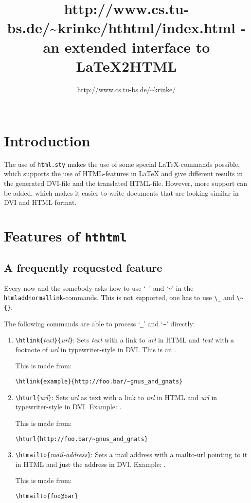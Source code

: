 \documentclass[11pt,a4paper]{article}
\title{\htmladdnormallinkfoot{hthtml}
  {http://www.cs.tu-bs.de/\~{}krinke/hthtml/index.html}
  - an extended interface to LaTeX2HTML}
\author{\htmladdnormallinkfoot{Jens Krinke}%
  {http://www.cs.tu-bs.de/\~{}krinke/}\\
  \htmailto{j.krinke@tu-bs.de}\\
  \htmladdnormallinkfoot{TU Braunschweig}{http://www.tu-bs.de/}}
\begin{document}
\maketitle
\tableofcontents
\section{Introduction}
The use of \texttt{html.sty} makes the use of some special
\LaTeX-commands possible, which supports the use of HTML-features in
LaTeX and give different results in the generated DVI-file and the
translated HTML-file.  However, more support can be added, which makes
it easier to write documents that are looking similar in DVI and HTML
format.

\section{Features of \texttt{hthtml}}

\subsection{A frequently requested feature}

Every now and the somebody asks how to use `\verb|_|' and
`\verb|~|' in the \texttt{htmladdnormallink}-commands.  This is
not supported, one has to use \verb|\_| and \verb|\~{}|.

The following commands are able to process `\verb|_|' and `\verb|~|'
directly:
\begin{enumerate}
\item \verb|\htlink{|\emph{text}\verb|}{|\emph{url}\verb|}|: Sets
  \emph{text} with a link to \emph{url} in HTML and \emph{text} with a
  footnote of \emph{url} in typewriter-style in DVI. This is an
  .

This is made from:
\begin{verbatim}
\htlink{example}{http://foo.bar/~gnus_and_gnats}
\end{verbatim}

\item \verb|\hturl{|\emph{url}\verb|}|: Sets \emph{url} as text with a
  link to \emph{url} in HTML and \emph{url} in typewriter-style in
  DVI. Example: .

This is made from:
\begin{verbatim}
\hturl{http://foo.bar/~gnus_and_gnats}
\end{verbatim}

\item \verb|\htmailto{|\emph{mail-address}\verb|}|: Sets a mail address
  with a mailto-url pointing to it in HTML and just the address in
  DVI.  Example: .

This is made from:
\begin{verbatim}
\htmailto{foo@bar}
\end{verbatim}

\end{enumerate}
\end{document}
